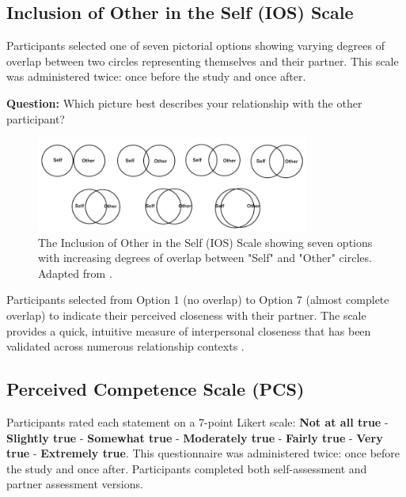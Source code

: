 \subsection{Inclusion of Other in the Self (IOS) Scale}
\label{appendix:ios}

Participants selected one of seven pictorial options showing varying degrees of overlap between two circles representing themselves and their partner. This scale was administered twice: once before the study and once after.

\textbf{Question:} Which picture best describes your relationship with the other participant?

\begin{figure}[h]
\centering
\includegraphics[width=0.8\textwidth]{assets/appendix/ios-circles.png}
\caption{The Inclusion of Other in the Self (IOS) Scale showing seven options with increasing degrees of overlap between "Self" and "Other" circles. Adapted from \cite{aron1991close}.}
\label{fig:ios-scale}
\end{figure}

Participants selected from Option 1 (no overlap) to Option 7 (almost complete overlap) to indicate their perceived closeness with their partner. The scale provides a quick, intuitive measure of interpersonal closeness that has been validated across numerous relationship contexts \cite{aron1991close}.

\subsection{Perceived Competence Scale (PCS)}
\label{appendix:pcs}

Participants rated each statement on a 7-point Likert scale: \textbf{Not at all true} - \textbf{Slightly true} - \textbf{Somewhat true} - \textbf{Moderately true} - \textbf{Fairly true} - \textbf{Very true} - \textbf{Extremely true}. This questionnaire was administered twice: once before the study and once after. Participants completed both self-assessment and partner assessment versions.

